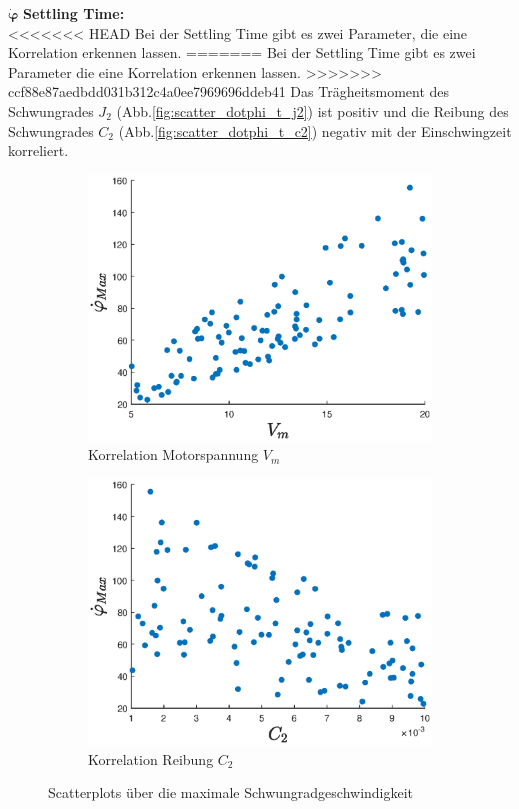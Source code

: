 $\bm{\dot\varphi}$ \textbf{Settling Time: }\\
<<<<<<< HEAD
Bei der Settling Time gibt es zwei Parameter, die  eine Korrelation erkennen lassen.
=======
Bei der Settling Time gibt es zwei Parameter die  eine Korrelation erkennen lassen.
>>>>>>> ccf88e87aedbdd031b312c4a0ee7969696ddeb41
Das Trägheitsmoment des Schwungrades $J_2$ (Abb.\ref{fig:scatter_dotphi_t_j2}) ist positiv und die Reibung des Schwungrades $C_2$ (Abb.\ref{fig:scatter_dotphi_t_c2}) negativ mit der Einschwingzeit korreliert.
\begin{figure}
    \centering
    \begin{subfigure}[]{0.45\textwidth}
        \centering
        \includegraphics[width=\textwidth]{Bilder/5_sensi/cm/dot_phi_max.eps}
        \caption{Korrelation Motorspannung $V_m$}
        \label{fig:scatter_dotphi_max}
    \end{subfigure}
   \begin{subfigure}[]{0.45\textwidth}
        \centering
        \includegraphics[width=\textwidth]{Bilder/5_sensi/cm/dot_phi_max_c2.eps}
        \caption{Korrelation Reibung $C_2$}
        \label{fig:scatter_dotphi_c2}
    \end{subfigure}
    \caption{Scatterplots über die maximale Schwungradgeschwindigkeit}
\end{figure}

